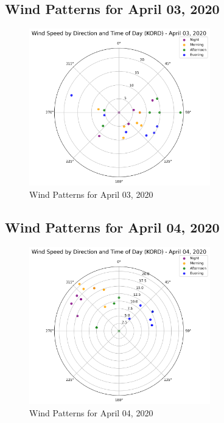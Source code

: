 \subsection{Wind Patterns for April 03, 2020}
\begin{figure}[htbp]
\centering
\includegraphics[width=0.7\textwidth]{wind_radar_plot_20200403.png}
\caption{Wind Patterns for April 03, 2020}
\label{fig:wind_20200403}
\end{figure}

\subsection{Wind Patterns for April 04, 2020}
\begin{figure}[htbp]
\centering
\includegraphics[width=0.7\textwidth]{wind_radar_plot_20200404.png}
\caption{Wind Patterns for April 04, 2020}
\label{fig:wind_20200404}
\end{figure}

